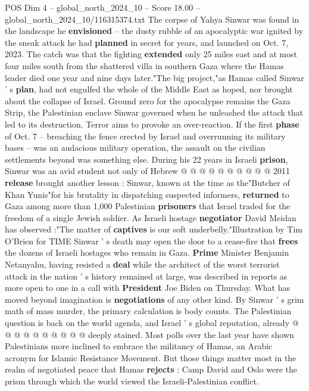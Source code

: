 \begin{textsample}{POS Dim 4 – global\_north\_2024\_10 – Score 18.00 – global\_north\_2024\_10/116315374.txt}  \label{ex:f4_pos_407}
The corpse of Yahya Sinwar was found in the landscape he \textbf{envisioned} -- the dusty rubble of an apocalyptic war ignited by the sneak attack he had \textbf{planned} in secret for years, and launched on Oct. 7, 2023.
The catch was that the fighting \textbf{extended} only 25 miles east and at most four miles south from the shattered villa in southern Gaza where the Hamas leader died one year and nine days later."The big project,"as Hamas called Sinwar ' s \textbf{plan}, had not engulfed the whole of the Middle East as hoped, nor brought about the collapse of Israel.
Ground zero for the apocalypse remains the Gaza Strip, the Palestinian enclave Sinwar governed when he unleashed the attack that led to its destruction.
Terror aims to provoke an over-reaction.
If the first \textbf{phase} of Oct. 7 -- breaching the fence erected by Israel and overrunning its military bases -- was an audacious military operation, the assault on the civilian settlements beyond was something else.
During his 22 years in Israeli \textbf{prison}, Sinwar was an avid student not only of Hebrew @ @ @ @ @ @ @ @ @ @ 2011 \textbf{release} brought another lesson : Sinwar, known at the time as the"Butcher of Khan Yunis"for his brutality in dispatching suspected informers, \textbf{returned} to Gaza among more than 1,000 Palestinian \textbf{prisoners} that Israel traded for the freedom of a single Jewish soldier.
As Israeli hostage \textbf{negotiator} David Meidan has observed :"The matter of \textbf{captives} is our soft underbelly."Illustration by Tim O'Brien for TIME Sinwar ' s death may open the door to a cease-fire that \textbf{frees} the dozens of Israeli hostages who remain in Gaza. \textbf{Prime} Minister Benjamin Netanyahu, having resisted a \textbf{deal} while the architect of the worst terrorist attack in the nation ' s history remained at large, was described in reports as more open to one in a call with \textbf{President} Joe Biden on Thursday.
What has moved beyond imagination is \textbf{negotiations} of any other kind.
By Sinwar ' s grim math of mass murder, the primary calculation is body counts.
The Palestinian question is back on the world agenda, and Israel ' s global reputation, already @ @ @ @ @ @ @ @ @ @ deeply stained.
Most polls over the last year have shown Palestinians more inclined to embrace the militancy of Hamas, an Arabic acronym for Islamic Resistance Movement.
But those things matter most in the realm of negotiated peace that Hamas \textbf{rejects} : Camp David and Oslo were the prism through which the world viewed the Israeli-Palestinian conflict.

\end{textsample}
